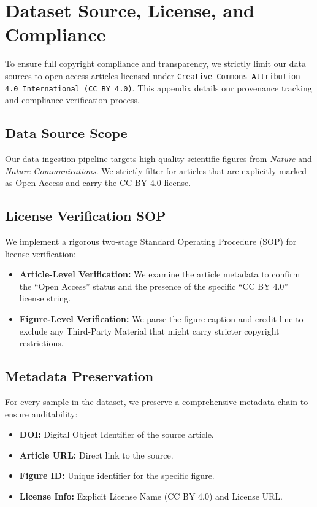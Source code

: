 \documentclass[runningheads]{llncs}
\begin{document}
\section{Dataset Source, License, and Compliance}
\label{sec:appendix_data_source}

To ensure full copyright compliance and transparency, we strictly limit our data sources to open-access articles licensed under \texttt{Creative Commons Attribution 4.0 International (CC BY 4.0)}. This appendix details our provenance tracking and compliance verification process.

\subsection{Data Source Scope}
Our data ingestion pipeline targets high-quality scientific figures from \textit{Nature} and \textit{Nature Communications}. We strictly filter for articles that are explicitly marked as Open Access and carry the CC BY 4.0 license.

\subsection{License Verification SOP}
We implement a rigorous two-stage Standard Operating Procedure (SOP) for license verification:
\begin{itemize}
    \item \textbf{Article-Level Verification:} We examine the article metadata to confirm the ``Open Access'' status and the presence of the specific ``CC BY 4.0'' license string.
    \item \textbf{Figure-Level Verification:} We parse the figure caption and credit line to exclude any Third-Party Material that might carry stricter copyright restrictions.
\end{itemize}

\subsection{Metadata Preservation}
For every sample in the dataset, we preserve a comprehensive metadata chain to ensure auditability:
\begin{itemize}
    \item \textbf{DOI:} Digital Object Identifier of the source article.
    \item \textbf{Article URL:} Direct link to the source.
    \item \textbf{Figure ID:} Unique identifier for the specific figure.
    \item \textbf{License Info:} Explicit License Name (CC BY 4.0) and License URL.
\end{itemize}
\end{document}
